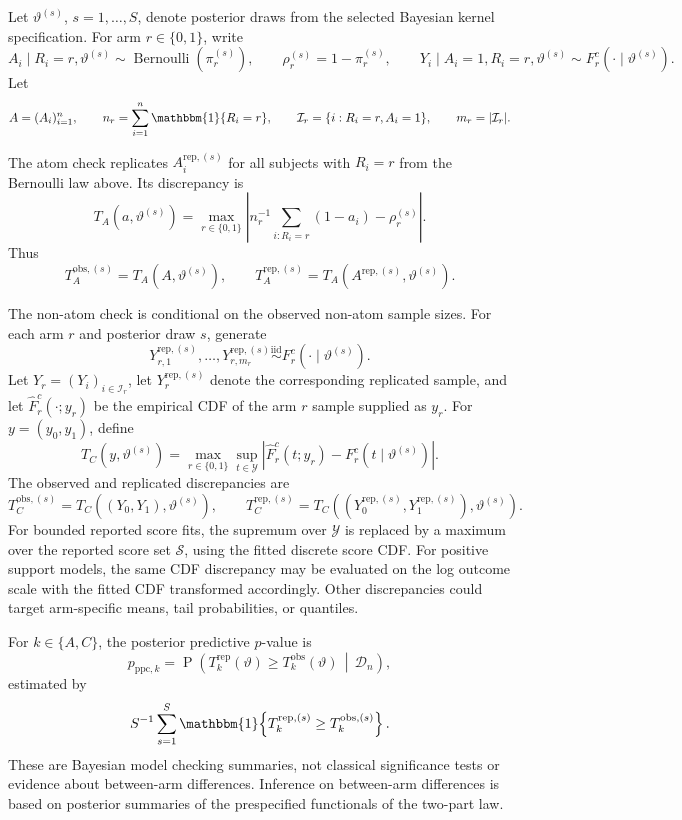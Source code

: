 \documentclass[11pt]{article}
\DeclareMathOperator{\Prob}{P}
\DeclareMathOperator{\Bernoulli}{Bernoulli}
\begin{document}
Let \(\vartheta^{(s)}\), \(s=1,\ldots,S\), denote posterior draws from the
selected Bayesian kernel specification. For arm \(r\in\{0,1\}\), write
\[
  A_i\mid R_i=r,\vartheta^{(s)}
  \sim\Bernoulli\!\left(\pi_r^{(s)}\right),
  \qquad
  \rho_r^{(s)}=1-\pi_r^{(s)},
  \qquad
  Y_i\mid A_i=1,R_i=r,\vartheta^{(s)}
  \sim F_r^c(\cdot\mid\vartheta^{(s)}).
\]
Let
\[
  A=(A_i)_{i=1}^n,
  \qquad
  n_r=\sum_{i=1}^n\mathbbm{1}\{R_i=r\},
  \qquad
  \mathcal{I}_r=\{i:R_i=r,A_i=1\},
  \qquad
  m_r=|\mathcal{I}_r|.
\]

The atom check replicates \(A_i^{\mathrm{rep},(s)}\) for all subjects with
\(R_i=r\) from the Bernoulli law above. Its discrepancy is
\[
  T_A(a,\vartheta^{(s)})
  =
  \max_{r\in\{0,1\}}
  \left|
    n_r^{-1}\sum_{i:R_i=r}(1-a_i)-\rho_r^{(s)}
  \right|.
\]
Thus
\[
  T_A^{\mathrm{obs},(s)}=T_A(A,\vartheta^{(s)}),
  \qquad
  T_A^{\mathrm{rep},(s)}
  =
  T_A(A^{\mathrm{rep},(s)},\vartheta^{(s)}).
\]

The non-atom check is conditional on the observed non-atom sample sizes. For
each arm \(r\) and posterior draw \(s\), generate
\[
  Y_{r,1}^{\mathrm{rep},(s)},\ldots,Y_{r,m_r}^{\mathrm{rep},(s)}
  \stackrel{\mathrm{iid}}{\sim}
  F_r^c(\cdot\mid\vartheta^{(s)}).
\]
Let \(Y_r=(Y_i)_{i\in\mathcal{I}_r}\), let
\(Y_r^{\mathrm{rep},(s)}\) denote the corresponding replicated sample, and let
\(\widehat{F}_r^c(\cdot;y_r)\) be the empirical CDF of the arm \(r\) sample supplied as \(y_r\). For \(y=(y_0,y_1)\), define
\[
  T_C(y,\vartheta^{(s)})
  =
  \max_{r\in\{0,1\}}
  \sup_{t\in\mathcal{Y}}
  \left|
    \widehat{F}_r^c(t;y_r)-F_r^c(t\mid\vartheta^{(s)})
  \right|.
\]
The observed and replicated discrepancies are
\[
  T_C^{\mathrm{obs},(s)}
  =
  T_C((Y_0,Y_1),\vartheta^{(s)}),
  \qquad
  T_C^{\mathrm{rep},(s)}
  =
  T_C((Y_0^{\mathrm{rep},(s)},Y_1^{\mathrm{rep},(s)}),\vartheta^{(s)}).
\]
For bounded reported score fits, the supremum over \(\mathcal{Y}\) is replaced
by a maximum over the reported score set \(\mathcal{S}\), using the fitted
discrete score CDF\@. For positive support models, the same CDF discrepancy may
be evaluated on the log outcome scale with the fitted CDF transformed
accordingly. Other discrepancies could target arm-specific means, tail
probabilities, or quantiles.

For \(k\in\{A,C\}\), the posterior predictive $p$-value is
\[
  p_{\mathrm{ppc},k}
  =
  \Prob\!\left(
    T_k^{\mathrm{rep}}(\vartheta)
    \geq
    T_k^{\mathrm{obs}}(\vartheta)
    \,\middle|\,
    \mathcal{D}_n
  \right),
\]
estimated by
\[
  S^{-1}\sum_{s=1}^S
  \mathbbm{1}\!\left\{
    T_k^{\mathrm{rep},(s)}
    \geq
    T_k^{\mathrm{obs},(s)}
  \right\}.
\]
These are Bayesian model checking summaries, not classical significance tests
or evidence about between-arm differences. Inference on between-arm differences
is based on posterior summaries of the prespecified functionals of the two-part
law.
\fi
\clearpage


\end{document}

